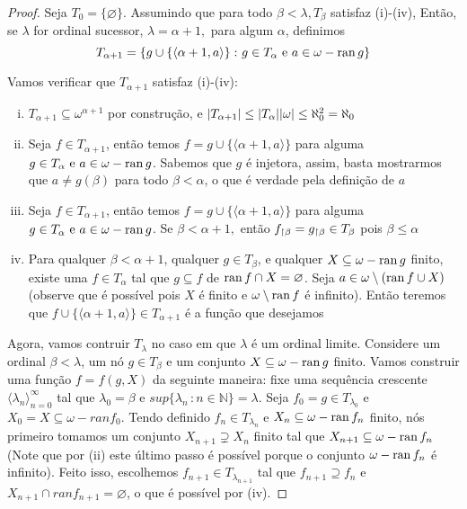 \documentclass[a4paper]{article}
\begin{document}
\begin{proof}
    
    Seja \(T_0=\{\varnothing\}\). Assumindo que para todo \(\beta<\lambda, T_\beta\) satisfaz (i)-(iv), Então, se \(\lambda\) for ordinal sucessor, \(\lambda=\alpha+1,\) para algum \(\alpha\), definimos
    \[T_{\alpha+1}=\{g\cup\{\langle \alpha+1, a\rangle\}\,\colon g\in
    T_\alpha \text{ e } a\in \omega -\operatorname{ran} g\}\]
    
    Vamos verificar que \(T_{\alpha+1}\) satisfaz (i)-(iv):
    \begin{enumerate}[(i)]
      \item \(T_{\alpha+1}\subseteq\omega^{\alpha+1}\) por construção, e \(\vert T_{\alpha+1} \vert\leq\vert T_\alpha \vert\vert \omega \vert \le \aleph_0^2=\aleph_0\)
      \item Seja \(f\in T_{\alpha+1}\), então temos \(f=g\cup\{\langle\alpha+1,a\rangle\}\) para alguma \(g\in
    T_\alpha \text{ e } a\in \omega -\operatorname{ran} g\). Sabemos que \(g\) é injetora, assim, basta mostrarmos que \(a\neq g(\beta)\) para todo \(\beta<\alpha\), o que é verdade pela definição de \(a\)
      \item Seja \(f\in T_{\alpha+1}\), então temos \(f=g\cup\{\langle\alpha+1,a\rangle\}\) para alguma \(g\in
    T_\alpha \text{ e } a\in \omega -\operatorname{ran} g\). Se \(\beta<\alpha+1,\) então \(f_{\upharpoonright \beta}=g_{\upharpoonright \beta}\in T_\beta\) pois \(\beta\leq\alpha\)
      \item Para qualquer \(\beta < \alpha+1\), qualquer \(g \in T_{\beta}\), e
    qualquer \(X \subseteq \omega - \operatorname{ran} g\) finito, existe uma \(f \in
    T_{\alpha}\) tal que \(g \subseteq f\) de \(\operatorname{ran} f \cap X = \varnothing\). Seja \(a\in\omega\setminus(\operatorname{ran} f\cup X)\) (observe que é possível pois \(X\) é finito e \(\omega\setminus\operatorname{ran} f\) é infinito). Então teremos que \(f\cup\{\langle\alpha+1,a\rangle\}\in T_{\alpha+1}\) é a função que desejamos
    \end{enumerate}
      
   Agora, vamos contruir \(T_{\lambda}\) no caso em que \(\lambda\) é um ordinal
   limite. Considere um ordinal \(\beta< \lambda\), um nó \(g \in T_{\beta}\) e
   um conjunto \(X \subseteq \omega - \operatorname{ran} g\) finito. Vamos construir uma
   função \(f = f(g, X)\) da seguinte maneira: fixe uma sequência
   crescente \(\langle \lambda_n \rangle_{n=0}^{\infty}\) tal que \(\lambda_0  =\beta\)
   e \(sup\{\lambda_n\,\colon n \in \mathbb{N}\} = \lambda\). Seja
   \(f_0 = g \in T_{\lambda_0}\) e \(X_0 = X \subseteq \omega - ranf_0\). Tendo
   definido \(f_n \in T_{\lambda_n}\) e \(X_n\subseteq \omega - \operatorname{ran} f_n\)
   finito, nós primeiro tomamos um conjunto \(X_{n+1} \supsetneq X_n\) finito tal
   que \(X_{n+1} \subseteq \omega - \operatorname{ran} f_n\) (Note que por (ii) este último passo é
   possível porque o conjunto \(\omega -\operatorname{ran} f_n\) é infinito).
   Feito isso, escolhemos \(f_{n+1} \in T_{\lambda_{n+1}}\) tal que \(f_{n+1}
   \supseteq f_n\) e  \(X_{n+1} \cap ranf_{n+1} = \varnothing\), o que é possível
   por (iv).
   

\end{proof}
\end{document}
